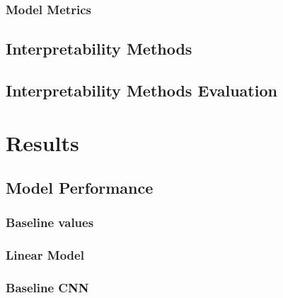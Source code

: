 \documentclass[biblatexBackend=bibtex]{tumthesis}
\begin{document}
\subsection{Model Metrics}
\label{sec:methodology:metrics}

\section{Interpretability Methods}
\label{sec:methodology:interpretability_methods}


%

\section{Interpretability Methods Evaluation}
\label{sec:methodology:vgig_eval}

\chapter{Results}
\label{ch:results}


\section{Model Performance}
\label{sec:model_performance}

\subsection{Baseline values}
\label{sec:results:bl_values}

\subsection{Linear Model}
\label{sec:results:lm}

\subsection{Baseline CNN}
\label{sec:results:bl_cnn}
\end{document}
